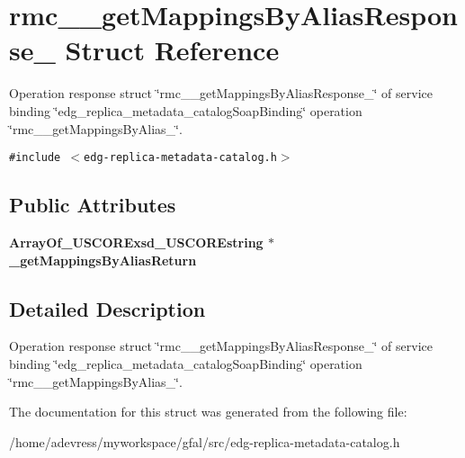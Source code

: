\section{rmc\_\-\_\-get\-Mappings\-By\-Alias\-Response\_\- Struct Reference}
\label{structrmc____getMappingsByAliasResponse__}
Operation response struct \char`\"{}rmc\_\-\_\-get\-Mappings\-By\-Alias\-Response\_\-\char`\"{} of service binding \char`\"{}edg\_\-replica\_\-metadata\_\-catalog\-Soap\-Binding\char`\"{} operation \char`\"{}rmc\_\-\_\-get\-Mappings\-By\-Alias\_\-\char`\"{}.  


{\tt \#include $<$edg-replica-metadata-catalog.h$>$}

\subsection*{Public Attributes}
\begin{CompactItemize}
\item 
\bf{Array\-Of\_\-USCORExsd\_\-USCOREstring} $\ast$ \textbf{\_\-get\-Mappings\-By\-Alias\-Return}\label{structrmc____getMappingsByAliasResponse___8d826c1dba4f1da2cbb2d0c8ea674492}

\end{CompactItemize}


\subsection{Detailed Description}
Operation response struct \char`\"{}rmc\_\-\_\-get\-Mappings\-By\-Alias\-Response\_\-\char`\"{} of service binding \char`\"{}edg\_\-replica\_\-metadata\_\-catalog\-Soap\-Binding\char`\"{} operation \char`\"{}rmc\_\-\_\-get\-Mappings\-By\-Alias\_\-\char`\"{}. 



The documentation for this struct was generated from the following file:\begin{CompactItemize}
\item 
/home/adevress/myworkspace/gfal/src/edg-replica-metadata-catalog.h\end{CompactItemize}

